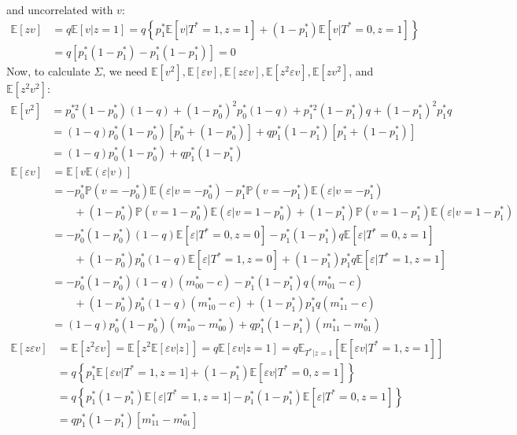\documentclass[12pt]{article}
\begin{document}
and uncorrelated with $v$:
\begin{align*}
  \mathbb{E}[zv] &= q\mathbb{E}[v|z=1] = q\left\{ p_1^*  \mathbb{E}[v|T^*=1,z=1] + (1 - p_1^*)\mathbb{E}[v|T^*=0,z=1]\right\} \\
  &= q \left[ p_1^* (1 - p_1^*) - p_1^* (1 - p_1^*)  \right] = 0
\end{align*}
Now, to calculate $\Sigma$, we need $\mathbb{E}[v^2], \mathbb{E}[\varepsilon v], \mathbb{E}[z\varepsilon v], \mathbb{E}[z^2\varepsilon v], \mathbb{E}[zv^2]$, and $\mathbb{E}[z^2v^2]$:
\begin{align*}
  \mathbb{E}[v^2] &=p_0^{*2}(1-p_0^*)(1 - q) + (1 - p_0^*)^2 p_0^*(1-q) + p_1^{*2}(1-p_1^*)q + (1-p_1^*)^2p_1^*q  \\ 
  &= (1-q)p_0^*(1 - p_0^*)\left[p_0^* + (1 - p_0^*)  \right] + qp_1^*(1 - p_1^*)\left[ p_1^* + (1 - p_1^*) \right]\\
  &= (1-q)p_0^*(1 - p_0^*) + qp_1^*(1 - p_1^*)
\end{align*}
\begin{align*}
  \mathbb{E}[\varepsilon v] &= \mathbb{E}\left[ v \mathbb{E}\left( \varepsilon|v \right) \right]\\
  &= -p_0^*\mathbb{P}(v = -p_0^*)\mathbb{E}(\varepsilon|v = -p_0^* ) - p_1^* \mathbb{P}(v = -p_1^* )\mathbb{E}(\varepsilon|v = -p_1^*) \\
  & \qquad {} + (1 - p_0^*)\mathbb{P}(v = 1-p_0^*)\mathbb{E}(\varepsilon|v = 1-p_0^*) + (1 -p_1^*)\mathbb{P}(v = 1- p_1^*)\mathbb{E}(\varepsilon|v = 1-p_1^*) \\
   &= -p_0^*(1-p_0^*)(1-q)\mathbb{E}[\varepsilon|T^*=0,z=0] - p_1^* (1-p_1^*)q\mathbb{E}[\varepsilon|T^*=0,z=1]\\
   &\qquad {} + (1 - p_0^*) p_0^*(1-q)\mathbb{E}[\varepsilon|T^*=1,z=0] + (1 - p_1^*)p_1^*q \mathbb{E}[\varepsilon|T^*=1,z=1]\\
   &= -p_0^*(1-p_0^*)(1-q)(m^*_{00}-c) -p_1^* (1-p_1^*)q(m^*_{01} - c)\\
   &\qquad {} + (1-p_0^*)p_0^*(1-q)(m^*_{10}-c) + (1 - p_1^*)p_1^*q (m^*_{11}-c)\\
   &= (1-q)p_0^*(1-p_0^*)(m_{10}^* - m_{00}^*) + qp_1^*(1-p_1^*)(m_{11}^* - m_{01}^*)
\end{align*}
\begin{align*}
  \mathbb{E}[z\varepsilon v] &= \mathbb{E}[z^2\varepsilon v] = \mathbb{E}\left[ z^2 \mathbb{E}\left[ \varepsilon v|z \right] \right] = q \mathbb{E}\left[ \varepsilon v|z=1 \right] = q \mathbb{E}_{T^*|z=1}\left[ \mathbb{E}\left[ \varepsilon v |T^*=1,z=1 \right] \right]\\
  &= q\left\{p_1^* \mathbb{E}\left[ \varepsilon v \right|T^*=1,z=1] + (1 - p_1^*)\mathbb{E}[\varepsilon v|T^*=0,z=1]\right\}\\
  &= q\left\{p_1^*(1 - p_1^*) \mathbb{E}\left[ \varepsilon  \right|T^*=1,z=1] - p_1^* (1 - p_1^*)\mathbb{E}[\varepsilon |T^*=0,z=1]\right\}\\
  &= q p_1^*(1-p_1^*)\left[m^*_{11} - m^*_{01} \right]
\end{align*}
\end{document}
